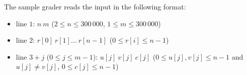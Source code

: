 The sample grader reads the input in the following format:
\begin{itemize}
\item line $1$: $n\ m$ ($2 \leq n \leq 300\,000$, $1 \leq m \leq 300\,000$)
\item line $2$: $r[0]\ r[1]\ldots \ r[n-1]$ ($0 \leq r[i] \leq n-1$)
\item line $3+j$ ($0 \leq j \leq m - 1$): $u[j]\ v[j]\ c[j]$ ($0 \leq u[j], v[j] \leq n-1$ and $u[j] \neq v[j]$, $0 \leq c[j] \leq n-1$)
\end{itemize}